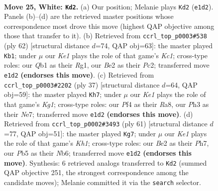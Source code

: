 \documentclass[11pt]{article}
\begin{document}
\clearpage

\begin{figure}[p]\centering
\begin{subfigure}{0.46\textwidth}\centering
\resizebox{\linewidth}{!}{%
\newchessgame
\chessboard[
  setfen={rn4r1/4k3/1p2p1n1/pPq2pN1/5P1p/7P/P3B1P1/RQ2K2R w - - 1 25},
  showmover=false,
  pgfstyle=straightmove, color=movearrow, markmove={e1-d2}
]}
\caption{}
\end{subfigure}\hfill
\begin{subfigure}{0.46\textwidth}\centering
\resizebox{\linewidth}{!}{%
\newchessgame
\chessboard[
  setfen={5r1k/6qP/r4pn1/p3p1p1/P2pP3/1P1N1Q2/2P2P2/2K3RR w - - 0 32},
  showmover=false,
  pgfstyle=straightmove, color=movearrow, markmove={c1-b1}
]}
\caption{}
\end{subfigure}
\\[4pt]
\begin{subfigure}{0.46\textwidth}\centering
\resizebox{\linewidth}{!}{%
\newchessgame
\chessboard[
  setfen={r2r2k1/p3np2/1q2pp1p/2p5/2Q4P/P3PN2/1P3PP1/1R3K1R b - - 2 19},
  showmover=false,
  pgfstyle=straightmove, color=movearrow, markmove={g8-h7}
]}
\caption{}
\end{subfigure}\hfill
\begin{subfigure}{0.46\textwidth}\centering
\resizebox{\linewidth}{!}{%
\newchessgame
\chessboard[
  setfen={2r4k/1p5p/1nqp1rp1/4p3/2P1PpP1/PQ3P2/2R3NP/3R3K b - - 0 31},
  showmover=false,
  pgfstyle=straightmove, color=movearrow, markmove={h8-g7}
]}
\caption{}
\end{subfigure}
\caption{\textbf{Move 25, White: \texttt{Kd2}.} (a) Our position; Melanie plays \texttt{Kd2} (\texttt{e1d2}). Panels (b)--(d) are the retrieved master positions whose correspondence most drove this move (highest QAP objective among those that transfer to it). (b) Retrieved from \texttt{ccrl\_top\_p0003\#538} (ply 62) [structural distance $d$=74, QAP obj=63]: the master played \texttt{Kb1}; under $\mu$ our \emph{Ke1} plays the role of that game's \emph{Kc1}; cross-type roles: our \emph{Q}b1 as their \emph{R}g1, our \emph{B}e2 as their \emph{P}c2; transferred move \texttt{e1d2} \textbf{(endorses this move)}. (c) Retrieved from \texttt{ccrl\_top\_p0003\#2202} (ply 37) [structural distance $d$=64, QAP obj=59]: the master played \texttt{Kh7}; under $\mu$ our \emph{Ke1} plays the role of that game's \emph{Kg1}; cross-type roles: our \emph{P}f4 as their \emph{R}a8, our \emph{P}h3 as their \emph{N}e7; transferred move \texttt{e1d2} \textbf{(endorses this move)}. (d) Retrieved from \texttt{ccrl\_top\_p0002\#3493} (ply 61) [structural distance $d$=77, QAP obj=51]: the master played \texttt{Kg7}; under $\mu$ our \emph{Ke1} plays the role of that game's \emph{Kh1}; cross-type roles: our \emph{B}e2 as their \emph{P}h7, our \emph{P}b5 as their \emph{N}b6; transferred move \texttt{e1d2} \textbf{(endorses this move)}. Synthesis: 6 retrieved analogs transferred to \texttt{Kd2} (summed QAP objective 251, the strongest correspondence among the candidate moves); Melanie committed it via the \texttt{search} selector.}
\label{fig:thought-m48}
\end{figure}
\end{document}
